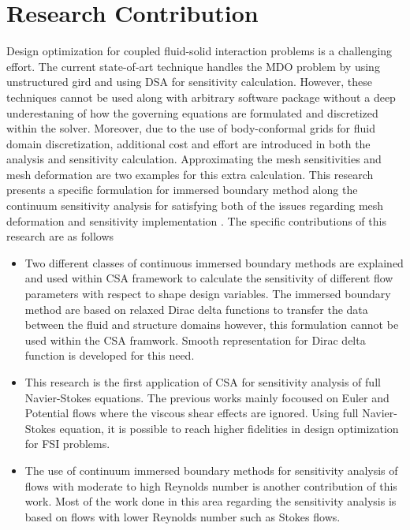 \section{Research Contribution}
Design optimization for coupled fluid-solid interaction problems is a challenging effort. The current state-of-art technique handles the MDO problem by using unstructured gird and using DSA for sensitivity calculation. However, these techniques cannot be used along with arbitrary software package without a deep underestaning of how the governing equations are formulated and discretized within the solver. Moreover, due to the use of body-conformal grids for fluid domain discretization, additional cost and effort are introduced in both the analysis and sensitivity calculation. Approximating the mesh sensitivities and mesh deformation are two examples for this extra calculation. This research presents a specific formulation for immersed boundary method along the continuum sensitivity analysis for satisfying both of the issues regarding mesh deformation and sensitivity implementation \cite{gobal2014continuum}. The specific contributions of this research are as follows

\begin{itemize}
	\item Two different classes of continuous immersed boundary methods are explained and used within CSA framework to calculate the sensitivity of different flow parameters with respect to shape design variables. The immersed boundary method are based on relaxed Dirac delta functions to transfer the data between the fluid and structure domains however, this formulation cannot be used within the CSA framwork. Smooth representation for Dirac delta function is developed for this need.
	\item This research is the first application of CSA for sensitivity analysis of full Navier-Stokes equations. The previous works mainly focoused on Euler and Potential flows where the viscous shear effects are ignored. Using full Navier-Stokes equation, it is possible to reach higher fidelities in design optimization for FSI problems.
	\item The use of continuum immersed boundary methods for sensitivity analysis of flows with moderate to high Reynolds number is another contribution of this work. Most of the work done in this area regarding the sensitivity analysis is based on flows with lower Reynolds number such as Stokes flows.
\end{itemize}
